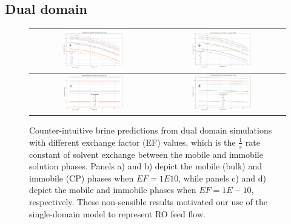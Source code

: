 \begin{supplementary}
\subsection{Dual domain}

\begin{figure}
    \centering
    \begin{tabular}{c|c}
        \includegraphics[width=0.49\textwidth]{images/ROSSpy/sensitivity_analyses/EF/mobile_large_ef.png} &
        \includegraphics[width=0.49\textwidth]{images/ROSSpy/sensitivity_analyses/EF/immobile_large_ef.png} \\ \midrule
        \includegraphics[width=0.49\textwidth]{images/ROSSpy/sensitivity_analyses/EF/mobile_small_ef.png} & 
        \includegraphics[width=0.49\textwidth]{images/ROSSpy/sensitivity_analyses/EF/immobile_small_ef.png} \\ \bottomrule
    \end{tabular}
    \caption{
        Counter-intuitive brine predictions from dual domain simulations with different exchange factor (EF) values, which is the $\frac{1}{s}$ rate constant of solvent exchange between the mobile and immobile solution phases. Panels a) and b) depict the mobile (bulk) and immobile (CP) phases when $EF=1E10$, while panels c) and d) depict the mobile and immobile phases when $EF=1E-10$, respectively. These non-sensible results motivated our use of the single-domain model to represent RO feed flow. 
    }
    \label{ef_values}
\end{figure}


\end{supplementary}

